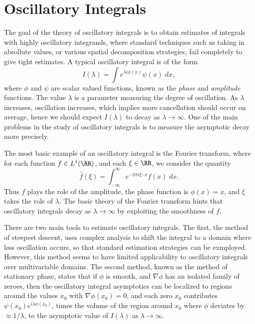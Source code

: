 \chapter{Oscillatory Integrals}

The goal of the theory of oscillatory integrals is to obtain estimates of integrals with highly oscillatory integrands, where standard techniques such as taking in absollute values, or various spatial decomposition strategies, fail completely to give tight estimates. A typical oscillatory integral is of the form
%
\[ I(\lambda) = \int e^{\lambda i \phi(x)} \psi(x)\; dx, \]
%
where $\phi$ and $\psi$ are scalar valued functions, known as the \emph{phase} and \emph{amplitude} functions. The value $\lambda$ is a parameter measuring the degree of oscillation. As $\lambda$ increases, oscillation increases, which implies more cancellation should occur on average, hence we should expect $I(\lambda)$ to decay as $\lambda \to \infty$. One of the main problems in the study of oscillatory integrals is to measure the asymptotic decay more precisely.

\begin{example}
    The most basic example of an oscillatory integral is the Fourier transform, where for each function $f \in L^1(\RR)$, and each $\xi \in \RR$, we consider the quantity
    \[ \widehat{f}(\xi) = \int_{-\infty}^\infty e^{- 2 \pi i \xi \cdot x} f(x)\; dx. \]
    Thus $f$ plays the role of the amplitude, the phase function is $\phi(x) = x$, and $\xi$ takes the role of $\lambda$. The basic theory of the Fourier transform hints that oscillatory integrals decay as $\lambda \to \infty$ by exploiting the smoothness of $f$.
\end{example}

There are two main tools to estimate oscillatory integrals. The first, the method of steepest descent, uses complex analysis to shift the integral to a domain where less oscillation occurs, so that standard estimation strategies can be exmployed. However, this method seems to have limited applicability to oscillatory integrals over multivariable domains. The second method, known as the method of stationary phase, states that if $\phi$ is smooth, and $\nabla \phi$ has an isolated family of zeroes, then the oscillatory integral asymptotics can be localized to regions around the values $x_0$ with $\nabla \phi(x_0) = 0$, and each zero $x_0$ contributes $\psi(x_0) e^{i  \lambda \phi(x_0)}$, times the volume of the region around $x_0$ where $\phi$ deviates by $\approx 1/\lambda$, to the asymptotic value of $I(\lambda)$ as $\lambda \to \infty$.

